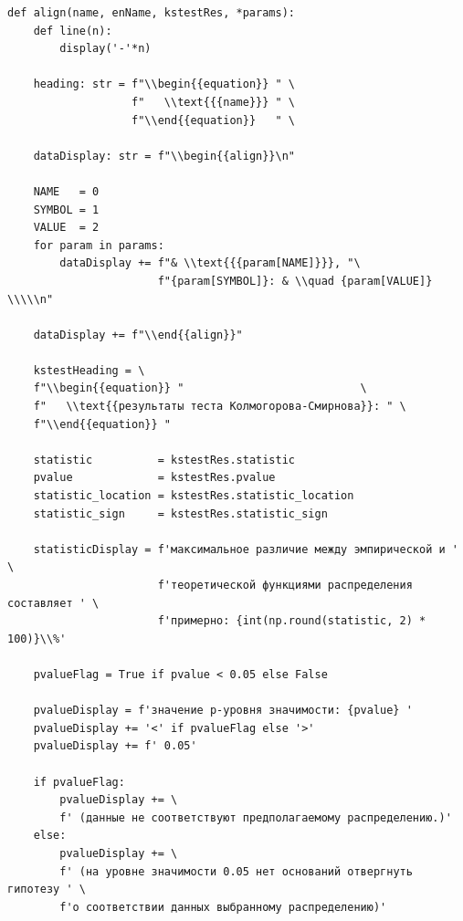 \documentclass[a4paper, 14pt]{extarticle}
\begin{document}
\begin{lstlisting}[caption={Анализ и вывод полученных данных в ходе теста Колмогорова-Смирнова}, label={lst:11}]
def align(name, enName, kstestRes, *params):
    def line(n):
        display('-'*n)

    heading: str = f"\\begin{{equation}} " \
                   f"   \\text{{{name}}} " \
                   f"\\end{{equation}}   " \
    
    dataDisplay: str = f"\\begin{{align}}\n" 

    NAME   = 0
    SYMBOL = 1
    VALUE  = 2
    for param in params:
        dataDisplay += f"& \\text{{{param[NAME]}}}, "\
                       f"{param[SYMBOL]}: & \\quad {param[VALUE]} \\\\\n"

    dataDisplay += f"\\end{{align}}" 

    kstestHeading = \
    f"\\begin{{equation}} "                           \
    f"   \\text{{результаты теста Колмогорова-Смирнова}}: " \
    f"\\end{{equation}} "                                  

    statistic          = kstestRes.statistic
    pvalue             = kstestRes.pvalue
    statistic_location = kstestRes.statistic_location
    statistic_sign     = kstestRes.statistic_sign

    statisticDisplay = f'максимальное различие между эмпирической и '      \
                       f'теоретической функциями распределения составляет ' \
                       f'примерно: {int(np.round(statistic, 2) * 100)}\\%'

    pvalueFlag = True if pvalue < 0.05 else False

    pvalueDisplay = f'значение p-уровня значимости: {pvalue} '
    pvalueDisplay += '<' if pvalueFlag else '>'
    pvalueDisplay += f' 0.05'

    if pvalueFlag:
        pvalueDisplay += \
        f' (данные не соответствуют предполагаемому распределению.)'
    else:
        pvalueDisplay += \
        f' (на уровне значимости 0.05 нет оснований отвергнуть гипотезу ' \
        f'о соответствии данных выбранному распределению)'


\end{lstlisting}
\end{document}
